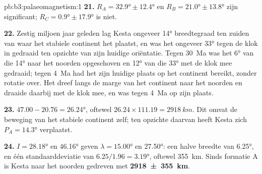 \begin{solution}{pb:b3:palaeomagnetism:1}
\textbf{21.} $R_A = \ang{32.9} \pm \ang{12.4}$ en $R_B = \ang{21.0} \pm
\ang{13.8}$ zijn significant; $R_C = \ang{0.9} \pm \ang{17.9}$ is niet.

\textbf{22.} Zestig miljoen jaar geleden lag Kesta ongeveer \ang{14} breedtegraad
ten zuiden van waar het stabiele continent het plaatst, en was het ongeveer \ang{33}
tegen de klok in gedraaid ten opzichte van zijn huidige oriëntatie. Tegen \qty{30}{Ma} was het
\ang{6} van die \ang{14} naar het noorden opgeschoven en \ang{12} van die \ang{33}
met de klok mee gedraaid; tegen \qty{4}{Ma} had het zijn huidige plaats op het continent bereikt,
zonder rotatie over. Het dreef langs de marge van het continent naar het noorden en draaide
daarbij met de klok mee, en was tegen \qty{4}{Ma} op zijn plaats.

\textbf{23.} $47.00 - 20.76 = \ang{26.24}$, oftewel $26.24\times111.19 =
\qty{2918}{km}$. Dit omvat de beweging van het stabiele continent zelf;
ten opzichte daarvan heeft Kesta zich $P_A = \ang{14.3}$ verplaatst.

\textbf{24.} $I = \ang{28.18}$ en \ang{46.16} geven $\lambda = \ang{15.00}$ en
\ang{27.50}: een halve breedte van \ang{6.25}, en één standaarddeviatie van
$6.25/1.96 = \ang{3.19}$, oftewel \qty{355}{km}. Sinds formatie A is Kesta
naar het noorden gedreven met
\textbf{\qty[text-series-to-math=true]{2918 \pm 355}{km}}.
\end{solution}
